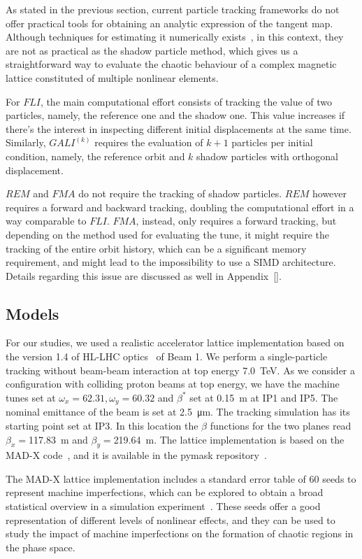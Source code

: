 As stated in the previous section, current particle tracking frameworks do not offer practical tools for obtaining an analytic expression of the tangent map. Although techniques for estimating it numerically exists~\cite{}, in this context, they are not as practical as the shadow particle method, which gives us a straightforward way to evaluate the chaotic behaviour of a complex magnetic lattice constituted of multiple nonlinear elements.

For $FLI$, the main computational effort consists of tracking the value of two particles, namely, the reference one and the shadow one. This value increases if there's the interest in inspecting different initial displacements at the same time. Similarly, $GALI^{(k)}$ requires the evaluation of $k+1$ particles per initial condition, namely, the reference orbit and $k$ shadow particles with orthogonal displacement.

$REM$ and $FMA$ do not require the tracking of shadow particles. $REM$ however requires a forward and backward tracking, doubling the computational effort in a way comparable to $FLI$. $FMA$, instead, only requires a forward tracking, but depending on the method used for evaluating the tune, it might require the tracking of the entire orbit history, which can be a significant memory requirement, and might lead to the impossibility to use a SIMD architecture. Details regarding this issue are discussed as well in Appendix~\ref{}.

\subsection{Models} \label{sec:model}
%
For our studies, we used a realistic accelerator lattice implementation based on the version 1.4 of HL-LHC optics~\cite{} of Beam 1. We perform a single-particle tracking without beam-beam interaction at top energy \SI{7.0}{TeV}. As we consider a configuration with colliding proton beams at top energy, we have the machine tunes set at $\omega_x=62.31, \omega_y=60.32$ and $\beta^\ast$ set at \SI{0.15}{\meter} at IP1 and IP5. The nominal emittance of the beam is set at \SI{2.5}{\micro \meter}. The tracking simulation has its starting point set at IP3. In this location the $\beta$ functions for the two planes read $\beta_x=$\SI{117.83}{\meter} and $\beta_y=$\SI{219.64}{\meter}. The lattice implementation is based on the MAD-X code~\cite{}, and it is available in the pymask repository~\cite{}.

The MAD-X lattice implementation includes a standard error table of 60 seeds to represent machine imperfections, which can be explored to obtain a broad statistical overview in a simulation experiment~\cite{}. These seeds offer a good representation of different levels of nonlinear effects, and they can be used to study the impact of machine imperfections on the formation of chaotic regions in the phase space.

